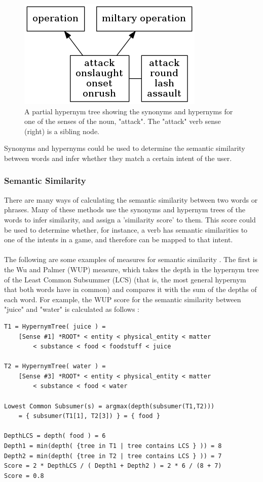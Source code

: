 \documentclass[12pt]{article}
\begin{document}
\begin{center}
\begin{figure}[H]
\begin{center}
  \includegraphics[scale=1]{hypernym-tree.png}
  \caption{A partial hypernym tree showing the synonyms and hypernyms for one of the senses of the noun, "attack". The "attack" verb sense (right) is a sibling node.}
  \end{center}
\end{figure}
\end{center}

Synonyms and hypernyms could be used to determine the semantic similarity between words and infer whether they match a certain intent of the user.

\subsubsection{Semantic Similarity}

There are many ways of calculating the semantic similarity between two words or phrases. Many of these methods use the synonyms and hypernym trees of the words to infer similarity, and assign a 'similarity score' to them. This score could be used to determine whether, for instance, a verb has semantic similarities to one of the intents in a game, and therefore can be mapped to that intent.
\\
\\
The following are some examples of measures for semantic similarity \cite{RefWorks:46}. The first is the Wu and Palmer (WUP) measure, which takes the depth in the hypernym tree of the Least Common Subsummer (LCS) (that is, the most general hypernym that both words have in common) and compares it with the sum of the depths of each word. For example, the WUP score for the semantic similarity between "juice" and "water" is calculated as follows \cite{RefWorks:49}:

\begin{lstlisting}[frame=single]
T1 = HypernymTree( juice ) =
    [Sense #1] *ROOT* < entity < physical_entity < matter
    	< substance < food < foodstuff < juice

T2 = HypernymTree( water ) =
    [Sense #3] *ROOT* < entity < physical_entity < matter
    	< substance < food < water

Lowest Common Subsumer(s) = argmax(depth(subsumer(T1,T2)))
    = { subsumer(T1[1], T2[3]) } = { food }

DepthLCS = depth( food ) = 6
Depth1 = min(depth( {tree in T1 | tree contains LCS } )) = 8
Depth2 = min(depth( {tree in T2 | tree contains LCS } )) = 7
Score = 2 * DepthLCS / ( Depth1 + Depth2 ) = 2 * 6 / (8 + 7)
Score = 0.8
\end{lstlisting}
\end{document}
